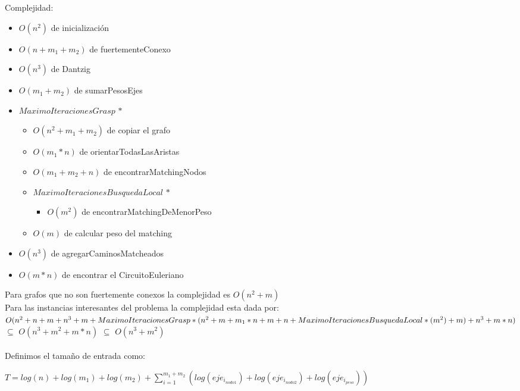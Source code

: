 \documentclass[11pt, a4paper, spanish]{article}
\begin{document}
\newpage

Complejidad:
	\begin{itemize}
	\item $O(n^{2})$ de inicializaci\'on
	\item $O(n + m_{1} + m_{2})$ de fuertementeConexo
	\item $O(n^{3})$ de Dantzig
	\item $O(m_{1} + m_{2})$ de sumarPesosEjes
	\item $MaximoIteracionesGrasp$ $*$
	\begin{itemize}
		\item $O(n^{2} + m_{1} + m_{2})$ de copiar el grafo
		\item $O(m_{1} * n)$ de orientarTodasLasAristas
		\item $O(m_{1} + m_{2} + n)$ de encontrarMatchingNodos
		\item $MaximoIteracionesBusquedaLocal$ $*$
		\begin{itemize}
			\item $O(m^{2})$ de encontrarMatchingDeMenorPeso
		\end{itemize}
		\item $O(m)$ de calcular peso del matching
	\end{itemize}
	\item $O(n^{3})$ de agregarCaminosMatcheados
	\item $O(m*n)$ de encontrar el CircuitoEuleriano
	\end{itemize} 
Para grafos que no son fuertemente conexos la complejidad es $O(n^{2} + m)$\\
Para las instancias interesantes del problema la complejidad esta dada por:\\
$O(n^{2} + n + m + n^{3} + m + \\MaximoIteracionesGrasp*(n^{2} + m + m_{1} * n + m + n + MaximoIteracionesBusquedaLocal*(m^{2}) + m ) + n^{3} + m*n)$ $\subseteq$
$O(n^{3} + m^{2} + m*n)$ $\subseteq$ $O(n^{3} + m^{2})$\\
\\
Definimos el tama\~{n}o de entrada como:

	\begin{center}	
	$T = log(n) + log(m_{1}) + log(m_{2}) + \displaystyle\sum_{i=1}^{m_{1} + m_{2}}{(log(eje_{i_{nodo1}})+log(eje_{i_{nodo2}}) + log(eje_{i_{peso}}))}$\\
	\end{center}
\end{document}
